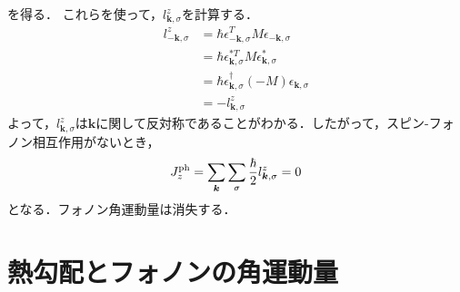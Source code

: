 \documentclass{report}
\begin{document}
を得る．
これらを使って，$l_{\bm{k},\sigma}^z$を計算する．
\begin{align}
  l_{-\bm{k},\sigma}^z &= \hbar \epsilon_{-\bm{k},\sigma}^T M \epsilon_{-\bm{k},\sigma}\\
  &= \hbar \epsilon_{\bm{k},\sigma}^{*T} M \epsilon_{\bm{k},\sigma}^{*}\\
  &= \hbar \epsilon_{\bm{k},\sigma}^{\dagger}(-M)\epsilon_{\bm{k},\sigma}\\
  &= -l_{\bm{k},\sigma}^z
\end{align}
よって，$l_{\bm{k},\sigma}^z$は$\bm{k}$に関して反対称であることがわかる．したがって，スピン-フォノン相互作用がないとき，
\begin{align}
  J_z^{\mathrm{ph}} = \sum_{\bm{k}}\sum_{\sigma} \frac{\hbar}{2} l_{\bm{k},\sigma}^{z} = 0
\end{align}
となる．フォノン角運動量は消失する．

\section{熱勾配とフォノンの角運動量}
\end{document}
